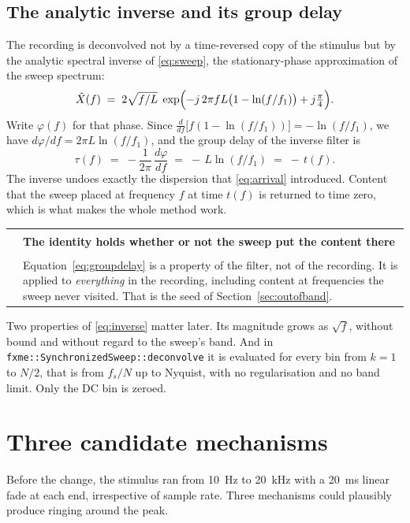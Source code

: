 \documentclass[11pt,a4paper]{article}
\makeatletter
\newcommand{\code}[1]{\texttt{\small #1}}
\newenvironment{remark}[1]
  {\par\medskip\noindent\begin{tabular}{@{}p{0.03\textwidth}p{0.93\textwidth}@{}}
   \textcolor{smtblue}{\rule{2pt}{\baselineskip}} & \textbf{#1}\\[2pt] & \ignorespaces}
  {\end{tabular}\par\medskip}
\makeatother
\begin{document}
\subsection{The analytic inverse and its group delay}

The recording is deconvolved not by a time-reversed copy of the stimulus but by
the analytic spectral inverse of \eqref{eq:sweep}, the stationary-phase
approximation of the sweep spectrum:
%
\begin{equation}
  \tilde X(f) \;=\; 2\sqrt{f/L}\;
    \exp\Bigl( -j\,2\pi f L \bigl( 1 - \ln (f/f_1) \bigr) + j\tfrac{\pi}{4} \Bigr).
  \label{eq:inverse}
\end{equation}
%
Write $\varphi(f)$ for that phase. Since
$\frac{d}{df}\bigl[ f (1 - \ln (f/f_1)) \bigr] = -\ln(f/f_1)$, we have
$d\varphi/df = 2\pi L \ln (f/f_1)$, and the group delay of the inverse filter is
%
\begin{equation}
  \tau(f) \;=\; -\frac{1}{2\pi}\,\frac{d\varphi}{df}
           \;=\; -\,L \ln (f/f_1) \;=\; -\,t(f).
  \label{eq:groupdelay}
\end{equation}
%
The inverse undoes exactly the dispersion that \eqref{eq:arrival} introduced.
Content that the sweep placed at frequency $f$ at time $t(f)$ is returned to
time zero, which is what makes the whole method work.

\begin{remark}{The identity holds whether or not the sweep put the content there}
Equation~\eqref{eq:groupdelay} is a property of the filter, not of the
recording. It is applied to \emph{everything} in the recording, including
content at frequencies the sweep never visited. That is the seed of
Section~\ref{sec:outofband}.
\end{remark}

Two properties of \eqref{eq:inverse} matter later. Its magnitude grows as
$\sqrt{f}$, without bound and without regard to the sweep's band. And in
\code{fxme::SynchronizedSweep::deconvolve} it is evaluated for every bin from
$k=1$ to $N/2$, that is from $f_s/N$ up to Nyquist, with no regularisation and
no band limit. Only the DC bin is zeroed.

\section{Three candidate mechanisms}
\label{sec:mechanisms}

Before the change, the stimulus ran from \SI{10}{\hertz} to
\SI{20}{\kilo\hertz} with a \SI{20}{\milli\second} linear fade at each end,
irrespective of sample rate. Three mechanisms could plausibly produce ringing
around the peak.
\end{document}
